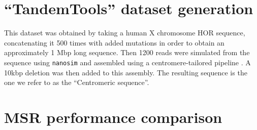 \documentclass[
  11pt,
  twoside,
  BCOR=10mm,
  listof=totoc]{scrbook}
\begin{document}
\hypertarget{appendix:tandemtools}{%
\section{``TandemTools'' dataset generation}\label{appendix:tandemtools}}

This dataset was obtained by taking a human X chromosome HOR sequence, concatenating it 500 times with added mutations in order to obtain an approximately 1 Mbp long sequence. Then 1200 reads were simulated from the sequence using \texttt{nanosim} \autocite{yangNanoSimNanoporeSequence2017} and assembled using a centromere-tailored pipeline \autocite{bzikadzeAutomatedAssemblyCentromeres2020}. A 10kbp deletion was then added to this assembly. The resulting sequence is the one we refer to as the ``Centromeric sequence''.

\hypertarget{msr-performance-comparison}{%
\section{MSR performance comparison}\label{msr-performance-comparison}}
\end{document}
